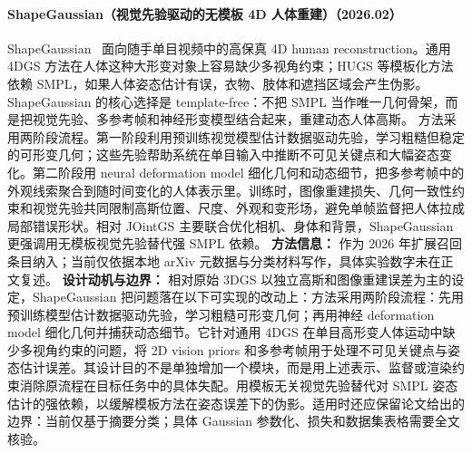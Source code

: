 \paragraph{ShapeGaussian（视觉先验驱动的无模板 4D 人体重建）（2026.02）}
ShapeGaussian~\cite{2602_05572} 面向随手单目视频中的高保真 4D human reconstruction。通用 4DGS 方法在人体这种大形变对象上容易缺少多视角约束；HUGS 等模板化方法依赖 SMPL，如果人体姿态估计有误，衣物、肢体和遮挡区域会产生伪影。ShapeGaussian 的核心选择是 template-free：不把 SMPL 当作唯一几何骨架，而是把视觉先验、多参考帧和神经形变模型结合起来，重建动态人体高斯。
方法采用两阶段流程。第一阶段利用预训练视觉模型估计数据驱动先验，学习粗糙但稳定的可形变几何；这些先验帮助系统在单目输入中推断不可见关键点和大幅姿态变化。第二阶段用 neural deformation model 细化几何和动态细节，把多参考帧中的外观线索聚合到随时间变化的人体表示里。训练时，图像重建损失、几何一致性约束和视觉先验共同限制高斯位置、尺度、外观和变形场，避免单帧监督把人体拉成局部错误形状。相对 JOintGS 主要联合优化相机、身体和背景，ShapeGaussian 更强调用无模板视觉先验替代强 SMPL 依赖。
\textbf{方法信息：} 作为 2026 年扩展召回条目纳入；当前仅依据本地 arXiv 元数据与分类材料写作，具体实验数字未在正文复述。
\textbf{设计动机与边界：} 相对原始 3DGS 以独立高斯和图像重建误差为主的设定，ShapeGaussian 把问题落在以下可实现的改动上：方法采用两阶段流程：先用预训练模型估计数据驱动先验，学习粗糙可形变几何；再用神经 deformation model 细化几何并捕获动态细节。它针对通用 4DGS 在单目高形变人体运动中缺少多视角约束的问题，将 2D vision priors 和多参考帧用于处理不可见关键点与姿态估计误差。其设计目的不是单独增加一个模块，而是用上述表示、监督或渲染约束消除原流程在目标任务中的具体失配。用模板无关视觉先验替代对 SMPL 姿态估计的强依赖，以缓解模板方法在姿态误差下的伪影。适用时还应保留论文给出的边界：当前仅基于摘要分类；具体 Gaussian 参数化、损失和数据集表格需要全文核验。
